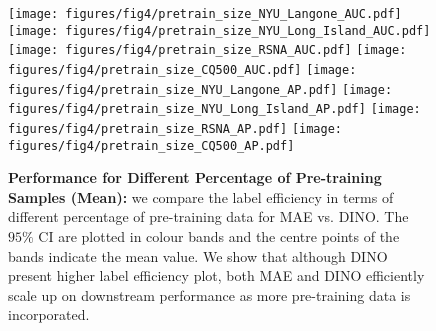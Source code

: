 \begin{figure}[t]
    \centering
    \texttt{[image: figures/fig4/pretrain\_size\_NYU\_Langone\_AUC.pdf]} 
    \texttt{[image: figures/fig4/pretrain\_size\_NYU\_Long\_Island\_AUC.pdf]}
    \texttt{[image: figures/fig4/pretrain\_size\_RSNA\_AUC.pdf]}
    \texttt{[image: figures/fig4/pretrain\_size\_CQ500\_AUC.pdf]}
    \texttt{[image: figures/fig4/pretrain\_size\_NYU\_Langone\_AP.pdf]}
    \texttt{[image: figures/fig4/pretrain\_size\_NYU\_Long\_Island\_AP.pdf]}
    \texttt{[image: figures/fig4/pretrain\_size\_RSNA\_AP.pdf]}
    \texttt{[image: figures/fig4/pretrain\_size\_CQ500\_AP.pdf]}
    \caption{\textbf{Performance for Different Percentage of Pre-training Samples (Mean):} we compare the label efficiency in terms of different percentage of pre-training data for MAE vs. DINO. The $95\%$ CI are plotted in colour bands and the centre points of the bands indicate the mean value. We show that although DINO present higher label efficiency plot, both MAE and DINO efficiently scale up on downstream performance as more pre-training data is incorporated.}
    \label{fig:scaling_law}
\end{figure}

